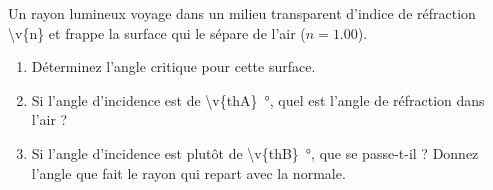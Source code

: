 Un rayon lumineux voyage dans un milieu transparent d'indice de réfraction \num{\v{n}} et frappe la surface qui le sépare de l'air ($n = \num{1.00}$).

\begin{enumerate}[label=\alph*)]
    \item Déterminez l'angle critique pour cette surface.
    \item Si l'angle d'incidence est de \qty{\v{thA}}{\degree}, quel est l'angle de réfraction dans l'air ?
    \item Si l'angle d'incidence est plutôt de \qty{\v{thB}}{\degree}, que se passe-t-il ? Donnez l'angle que fait le rayon qui repart avec la normale.
\end{enumerate}
